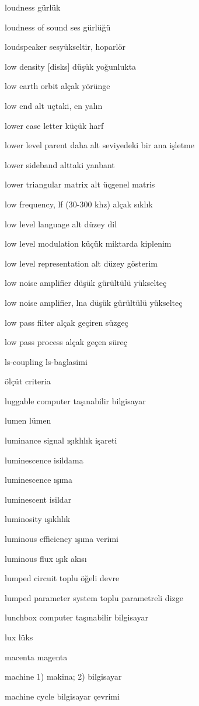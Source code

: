 \documentclass[12pt,fleqn]{article}\usepackage{../../common}
\begin{document}
loudness gürlük

loudness of sound ses gürlüğü

loudspeaker sesyükseltir, hoparlör

low density [disks] düşük yoğunlukta

low earth orbit alçak yörünge

low end alt uçtaki, en yalın

lower case letter küçük harf

lower level parent daha alt seviyedeki bir ana işletme

lower sideband alttaki yanbant

lower triangular matrix alt üçgenel matris

low frequency, lf (30-300 khz) alçak sıklık

low level language alt düzey dil

low level modulation küçük miktarda kiplenim

low level representation alt düzey gösterim

low noise amplifier düşük gürültülü yükselteç

low noise amplifier, lna düşük gürültülü yükselteç

low pass filter alçak geçiren süzgeç

low pass process alçak geçen süreç

ls-coupling ls-baglasimi

ölçüt criteria

luggable computer taşınabilir bilgisayar

lumen lümen

luminance signal ışıklılık işareti

luminescence isildama

luminescence ışıma

luminescent isildar

luminosity ışıklılık

luminous efficiency ışıma verimi

luminous flux ışık akısı

lumped circuit toplu öğeli devre

lumped parameter system toplu parametreli dizge

lunchbox computer taşınabilir bilgisayar

lux lüks

macenta magenta

machine 1) makina; 2) bilgisayar

machine cycle bilgisayar çevrimi
\end{document}

